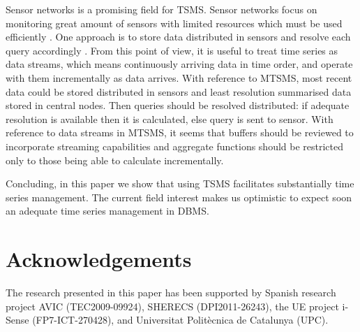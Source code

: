 Sensor networks is a promising field for TSMS. Sensor networks focus
on monitoring great amount of sensors with limited resources which
must be used efficiently \cite{yaogehrke02}. One approach is to store
data distributed in sensors and resolve each query accordingly
\cite{bonnet01}. From this point of view, it is useful to treat time
series as data streams, which means continuously arriving data in time
order, and operate with them incrementally as data arrives.  With
reference to MTSMS, most recent data could be stored distributed in
sensors and least resolution summarised data stored in central
nodes. Then queries should be resolved distributed: if adequate
resolution is available then it is calculated, else query is sent to
sensor.  With reference to data streams in MTSMS, it seems that
buffers should be reviewed to incorporate streaming capabilities and
aggregate functions should be restricted only to those being able
to calculate incrementally.


Concluding, in this paper we show that using TSMS facilitates
substantially time series management. The current field interest makes
us optimistic to expect soon an adequate time series management in
DBMS.


\section*{Acknowledgements}

The research presented in this paper has been supported by Spanish
research project AVIC (TEC2009-09924), SHERECS (DPI2011-26243), the UE
project i-Sense (FP7-ICT-270428), and Universitat Polit\`{e}cnica de
Catalunya (UPC).




